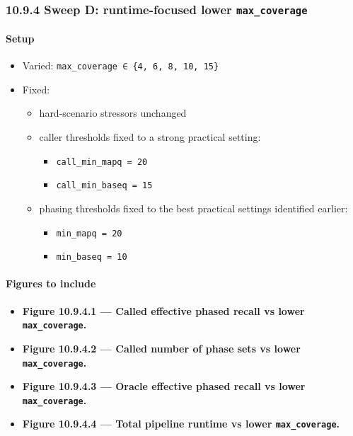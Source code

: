 \documentclass[
]{article}
\providecommand{\tightlist}{%
  \setlength{\itemsep}{0pt}\setlength{\parskip}{0pt}}
\begin{document}
\subsubsection{\texorpdfstring{10.9.4 Sweep D: runtime-focused lower
\texttt{max\_coverage}}{10.9.4 Sweep D: runtime-focused lower max\_coverage}}\label{sweep-d-runtime-focused-lower-max_coverage}

\paragraph{Setup}\label{setup-10}

\begin{itemize}
\tightlist
\item
  Varied: \texttt{max\_coverage\ ∈\ \{4,\ 6,\ 8,\ 10,\ 15\}}
\item
  Fixed:

  \begin{itemize}
  \tightlist
  \item
    hard-scenario stressors unchanged
  \item
    caller thresholds fixed to a strong practical setting:

    \begin{itemize}
    \tightlist
    \item
      \texttt{call\_min\_mapq\ =\ 20}
    \item
      \texttt{call\_min\_baseq\ =\ 15}
    \end{itemize}
  \item
    phasing thresholds fixed to the best practical settings identified
    earlier:

    \begin{itemize}
    \tightlist
    \item
      \texttt{min\_mapq\ =\ 20}
    \item
      \texttt{min\_baseq\ =\ 10}
    \end{itemize}
  \end{itemize}
\end{itemize}

\paragraph{Figures to include}\label{figures-to-include-10}

\begin{itemize}
\tightlist
\item
  \textbf{Figure 10.9.4.1 --- Called effective phased recall vs lower
  \texttt{max\_coverage}.}
\item
  \textbf{Figure 10.9.4.2 --- Called number of phase sets vs lower
  \texttt{max\_coverage}.}
\item
  \textbf{Figure 10.9.4.3 --- Oracle effective phased recall vs lower
  \texttt{max\_coverage}.}
\item
  \textbf{Figure 10.9.4.4 --- Total pipeline runtime vs lower
  \texttt{max\_coverage}.}
\end{itemize}
\end{document}
